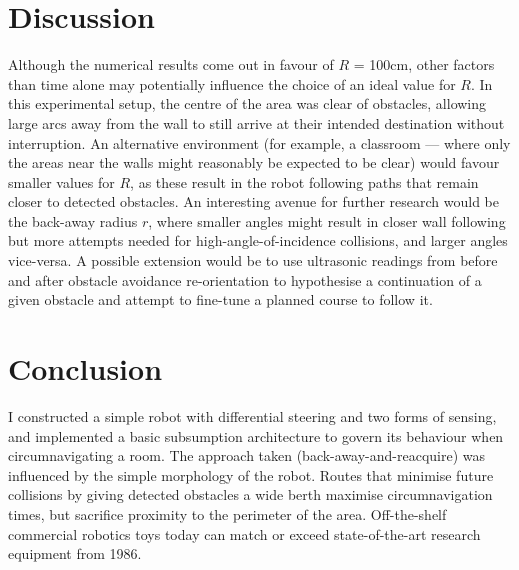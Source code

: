 \documentclass[a4paper,12pt]{article}
\begin{document}
\section{Discussion}

Although the numerical results come out in favour of $R$ = 100cm, other factors than time alone may potentially influence the choice of an ideal value for $R$. In this experimental setup, the centre of the area was clear of obstacles, allowing large arcs away from the wall to still arrive at their intended destination without interruption. An alternative environment (for example, a classroom --- where only the areas near the walls might reasonably be expected to be clear) would favour smaller values for $R$, as these result in the robot following paths that remain closer to detected obstacles. An interesting avenue for further research would be the back-away radius $r$, where smaller angles might result in closer wall following but more attempts needed for high-angle-of-incidence collisions, and larger angles vice-versa. A possible extension would be to use ultrasonic readings from before and after obstacle avoidance re-orientation to hypothesise a continuation of a given obstacle and attempt to fine-tune a planned course to follow it.


\section{Conclusion}

I constructed a simple robot with differential steering and two forms of sensing, and implemented a basic subsumption architecture to govern its behaviour when circumnavigating a room. The approach taken (back-away-and-reacquire) was influenced by the simple morphology of the robot. Routes that minimise future collisions by giving detected obstacles a wide berth maximise circumnavigation times, but sacrifice proximity to the perimeter of the area. Off-the-shelf commercial robotics toys today can match or exceed state-of-the-art research equipment from 1986.
\end{document}

